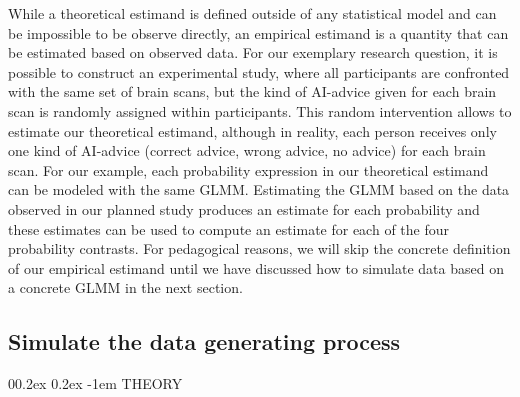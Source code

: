\documentclass[
  man,floatsintext]{apa6}
\makeatletter
\let\oldparagraph\paragraph
\renewcommand{\paragraph}[1]{\oldparagraph{#1}\mbox{}}
\renewcommand{\paragraph}{\@startsection{paragraph}{4}{\parindent}%
  {0\baselineskip \@plus 0.2ex \@minus 0.2ex}%
  {-1em}%
  {\normalfont\normalsize\bfseries\itshape\typesectitle}}
\makeatother
\begin{document}
While a theoretical estimand is defined outside of any statistical model and can be impossible to be observe directly, an empirical estimand is a quantity that can be estimated based on observed data.
For our exemplary research question, it is possible to construct an experimental study, where all participants are confronted with the same set of brain scans, but the kind of AI-advice given for each brain scan is randomly assigned within participants.
This random intervention allows to estimate our theoretical estimand, although in reality, each person receives only one kind of AI-advice (correct advice, wrong advice, no advice) for each brain scan.
For our example, each probability expression in our theoretical estimand can be modeled with the same GLMM.
Estimating the GLMM based on the data observed in our planned study produces an estimate for each probability and these estimates can be used to compute an estimate for each of the four probability contrasts.
For pedagogical reasons, we will skip the concrete definition of our empirical estimand until we have discussed how to simulate data based on a concrete GLMM in the next section.

\hypertarget{simulate-the-data-generating-process}{%
\subsection{Simulate the data generating process}\label{simulate-the-data-generating-process}}

\hypertarget{theory-1}{%
\paragraph{THEORY}\label{theory-1}}
\end{document}
